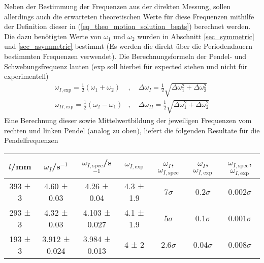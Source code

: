 \documentclass[12pt,a4paper,german]{scrartcl}
\numberwithin{equation}{section}
\begin{document}
  Neben der Bestimmung der Frequenzen aus der direkten Messung, sollen allerdings auch die erwarteten theoretischen Werte für diese Frequenzen mithilfe der Definition dieser in (\ref{eq_theo_motion_solution_beats}) berechnet werden.
  Die dazu benötigten Werte von $\omega_1$ und $\omega_2$ wurden in Abschnitt \ref{sec_symmetric} und \ref{sec_asymmetric} bestimmt (Es werden die direkt über die Periodendauern bestimmten Frequenzen verwendet).
  Die Berechnungsformeln der Pendel- und Schwebungsfrequenz lauten (exp soll hierbei für \glqq expected\grqq{} stehen und nicht für experimentell)
  \begin{align}
    \omega_{I,\text{exp}} = \frac{1}{2} (\omega_1 + \omega_2)&, \quad \Delta\omega_I = \frac{1}{2} \sqrt{\Delta\omega_1^2 + \Delta\omega_2^2} \nonumber \\
    \omega_{II,\text{exp}} = \frac{1}{2} (\omega_2 - \omega_1)&, \quad \Delta\omega_{II} = \frac{1}{2} \sqrt{\Delta\omega_1^2 + \Delta\omega_2^2}
    \label{eq_omega_I_II}
  \end{align}
  Eine Berechnung dieser sowie Mittelwertbildung der jeweiligen Frequenzen vom rechten und linken Pendel (analog zu oben), liefert die folgenden Resultate für die Pendelfrequenzen

  \begin{center}
    \begin{tabular}{c|c|c|c|c|c|c}
      $l$/mm & $\omega_I$/s$^{-1}$ & $\omega_{I,\text{spec}}$/s$^{-1}$ & $\omega_{I,\text{exp}}$ & $\omega_I$, $\omega_{I,\text{spec}}$ & $\omega_I$, $\omega_{I,\text{exp}}$ & $\omega_{I,\text{spec}}$, $\omega_{I,\text{exp}}$ \\
      \hline
      393 ± 3 &  4.60 ± 0.03  &  4.26 ± 0.04  & 4.3 ± 1.9 &     7$\sigma$ &    0.2$\sigma$ &  0.002$\sigma$ \\
      293 ± 3 &  4.32 ± 0.03  & 4.103 ± 0.027 & 4.1 ± 1.9 &     5$\sigma$ &    0.1$\sigma$ &  0.001$\sigma$ \\
      193 ± 3 & 3.912 ± 0.024 & 3.984 ± 0.013 &   4 ± 2   &   2.6$\sigma$ &   0.04$\sigma$ &  0.008$\sigma$
    \end{tabular}
    \label{table_beats_omega_I}
  \end{center}
\end{document}
